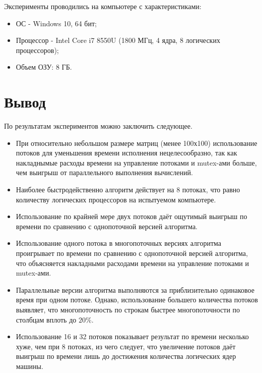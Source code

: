 Эксперименты проводились на компьютере с характеристиками:
\begin{itemize}
	\item ОС - Windows 10, 64 бит;
	\item Процессор -  Intel Core i7 8550U (1800 МГц, 4 ядра, 8 логических процессоров);
	\item Объем ОЗУ: 8 ГБ.
\end{itemize}

\section*{Вывод}
По результатам экспериментов можно заключить следующее.
\begin{itemize}
	\item При относительно небольшом размере матриц (менее 100х100) использование потоков для уменьшения времени исполнения нецелесообразно, так как накладнымые расходы времени на управление потоками и mutex-ами больше, чем выигрыш от параллельного выполнения вычислений.
	\item Наиболее быстродейственно алгоритм действует на 8 потоках, что равно количеству логических процессоров на испытуемом компьютере.
	\item Использование по крайней мере двух потоков даёт ощутимый выигрыш по времени по сравнению с однопоточной версией алгоритма.
	\item Использование одного потока в многопоточных версиях алгоритма проигрывает по времени по сравнению с однопоточной версией алгоритма, что объясняется накладными расходами времени на управление потоками и mutex-ами.
	\item Параллельные версии алгоритма выполняются за приблизительно одинаковое время при одном потоке. Однако, использование большего количества потоков выявляет, что многопоточность по строкам быстрее многопоточности по столбцам вплоть до $20\%$.
	\item Использование 16 и 32 потоков показывает результат по времени несколько хуже, чем при 8 потоках, из чего следует, что увеличение потоков даёт выигрыш по времени лишь до достижения количества логических ядер машины.
\end{itemize}


	